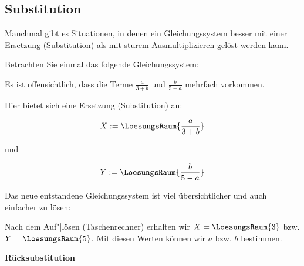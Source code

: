 %
\subsection{Substitution}


Manchmal gibt es Situationen, in denen ein Gleichungssystem besser mit
einer Ersetzung (Substitution) als mit sturem Ausmultiplizieren gelöst
werden kann.

Betrachten Sie einmal das folgende Gleichungssystem:


Es ist offensichtlich, dass die Terme $\frac{a}{3+b}$ und
$\frac{b}{5-a}$ mehrfach vorkommen.

Hier bietet sich eine Ersetzung (Substitution) an:

$$X := \LoesungsRaum{\frac{a}{3+b}}$$

und

$$Y := \LoesungsRaum{\frac{b}{5-a}}$$

Das neue entstandene Gleichungssystem ist viel übersichtlicher und
auch einfacher zu lösen:


Nach dem Auf"|lösen (\zB Taschenrechner) erhalten wir $X=\LoesungsRaum{3}$ bzw. $Y=\LoesungsRaum{5}$. Mit diesen Werten
können wir $a$ bzw. $b$ bestimmen.
\newpage

\textbf{Rücksubstitution}\,\\

\vspace{1mm}

\newpage


